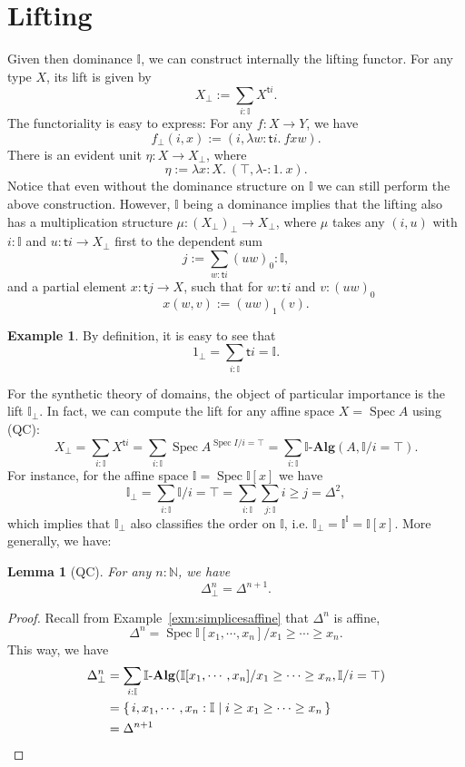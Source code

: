 \documentclass[12pt]{amsart}
\newtheorem{lemma}[theorem]{Lemma}
\theoremstyle{definition}
\newtheorem{example}[theorem]{Example}
\newcommand{\mb}[1]{\mathbf{#1}}
\newcommand{\mbb}[1]{\mathbb{#1}}
\newcommand{\I}{\mbb I}
\newcommand{\ms}[1]{\mathsf{#1}}
\newcommand{\alg}{\text{-}\mb{Alg}}
\newcommand{\scomp}[2]{\{\,#1\mid#2\,\}}
\newcommand{\N}{\mbb N}
\newcommand{\prt}{_{\bot}}
\newcommand{\ld}[2]{\lambda #1\!\colon\!\!#2.\ }
\newcommand{\hp}{\text{-}}
\newcommand{\spec}{\operatorname{Spec}}
\begin{document}
\section{Lifting}

Given then dominance $\I$, we can construct internally the lifting functor. For any type $X$, its lift is given by
\[ X\prt := \sum_{i:\I}X^{\ms ti}. \]
The functoriality is easy to express: For any $f : X \to Y$, we have
\[ f\prt(i,x) := (i,\ld{w}{\ms ti}fxw). \]
There is an evident unit $\eta : X \to X\prt$, where
\[ \eta := \ld x X(\top,\ld\hp 1 x). \]
Notice that even without the dominance structure on $\I$ we can still perform the above construction. However, $\I$ being a dominance implies that the lifting also has a multiplication structure $\mu : (X\prt)\prt \to X\prt$, where $\mu$ takes any $(i,u)$ with $i : \I$ and $u : \ms ti \to X\prt$ first to the dependent sum
\[ j := \sum_{w:\ms ti} (uw)_0 : \I, \]
and a partial element $x : \ms tj \to X$, such that for $w : \ms ti$ and $v : (uw)_0$
\[ x(w,v) := (uw)_1(v). \]

\begin{example}
  By definition, it is easy to see that
  \[ 1\prt = \sum_{i:\I}\ms ti = \I. \]
\end{example}

For the synthetic theory of domains, the object of particular importance is the lift $\I\prt$. In fact, we can compute the lift for any affine space $X = \spec A$ using (QC):
\[ X\prt = \sum_{i:\I}X^{\ms ti} = \sum_{i:\I}\spec A^{\spec I/i=\top} = \sum_{i:\I}\I\alg(A,\I/i=\top). \]
For instance, for the affine space $\I = \spec\I[x]$ we have
\[ \I\prt = \sum_{i:\I}\I/i=\top = \sum_{i:\I}\sum_{j:\I}i \ge j = \Delta^2, \]
which implies that $\I\prt$ also classifies the order on $\I$, i.e. $\I\prt = \I^\I = \I[x]$. More generally, we have:

\begin{lemma}[QC]
  For any $n : \N$, we have
  \[ \Delta^n\prt = \Delta^{n+1}. \]
\end{lemma}
\begin{proof}
  Recall from Example~\ref{exm:simplicesaffine} that $\Delta^n$ is affine,
  \[ \Delta^n = \spec\I[x_1,\cdots,x_n]/x_1\ge\cdots\ge x_n. \]
  This way, we have
  \begin{align*}
    \Delta^n\prt 
    &= \sum_{i:\I}\I\alg(\I[x_1,\cdots,x_n]/x_1\ge\cdots\ge x_n,\I/i=\top) \\
    &= \scomp{i,x_1,\cdots,x_n:\I}{i \ge x_1 \ge \cdots \ge x_n} \\
    &= \Delta^{n+1} \qedhere
  \end{align*}
\end{proof}
\end{document}
